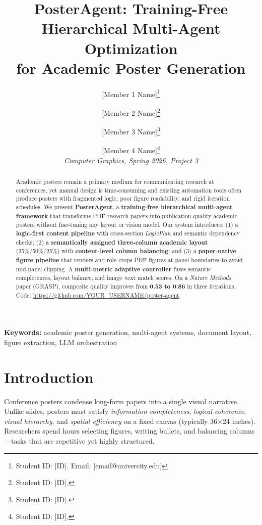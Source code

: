 \documentclass{article}
\title{\textbf{PosterAgent: Training-Free Hierarchical Multi-Agent Optimization\\for Academic Poster Generation}}
\author{
  [Member 1 Name]\thanks{Student ID: [ID]. Email: [email@university.edu]} \and
  [Member 2 Name]\thanks{Student ID: [ID].} \and
  [Member 3 Name]\thanks{Student ID: [ID].} \and
  [Member 4 Name]\thanks{Student ID: [ID].}\\[0.5em]
  \textit{Computer Graphics, Spring 2026, Project 3}
}
\date{}
\begin{document}
\maketitle

\begin{abstract}
Academic posters remain a primary medium for communicating research at conferences, yet manual design is time-consuming and existing automation tools often produce posters with fragmented logic, poor figure readability, and rigid iteration schedules. We present \textbf{PosterAgent}, a \textbf{training-free hierarchical multi-agent framework} that transforms PDF research papers into publication-quality academic posters without fine-tuning any layout or vision model. Our system introduces: (1) a \textbf{logic-first content pipeline} with cross-section \emph{LogicPlan} and semantic dependency checks; (2) a \textbf{semantically assigned three-column academic layout} (25\%/50\%/25\%) with \textbf{content-level column balancing}; and (3) a \textbf{paper-native figure pipeline} that renders and role-crops PDF figures at panel boundaries to avoid mid-panel clipping. A \textbf{multi-metric adaptive controller} fuses semantic completeness, layout balance, and image--text match scores. On a \emph{Nature Methods} paper (GRASP), composite quality improves from \textbf{0.53 to 0.86} in three iterations. Code: \url{https://github.com/YOUR_USERNAME/poster-agent}.
\end{abstract}

\noindent\textbf{Keywords:} academic poster generation, multi-agent systems, document layout, figure extraction, LLM orchestration

\section{Introduction}
\label{sec:intro}

Conference posters condense long-form papers into a single visual narrative. Unlike slides, posters must satisfy \emph{information completeness}, \emph{logical coherence}, \emph{visual hierarchy}, and \emph{spatial efficiency} on a fixed canvas (typically 36$\times$24 inches). Researchers spend hours selecting figures, writing bullets, and balancing columns---tasks that are repetitive yet highly structured.
\end{document}
